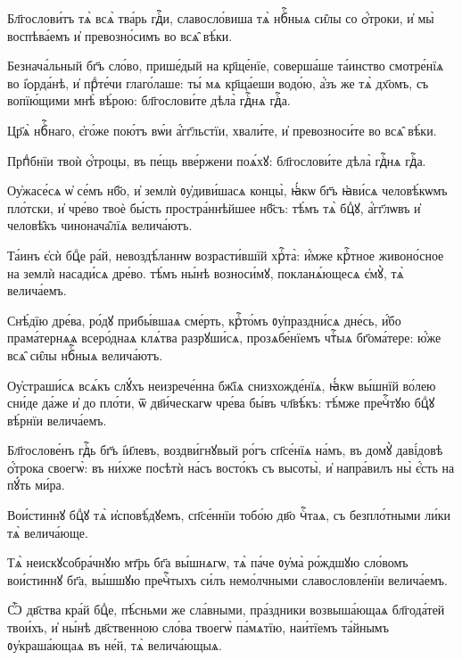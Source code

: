 \hKv Бл҃гослови́тъ тѧ̀ всѧ̀ тва́рь гдⷭ҇и, славосло́виша тѧ̀  нбⷭ҇ныѧ си̑лы со ѻ҆́троки, и҆ мы̀ воспѣва́емъ и҆  превозно́симъ во всѧ̑ вѣ́ки. 

\hKv Безнача́льный бг҃ъ сло́во, прише́дый на кр҃ще́нїе,  соверша́ше та́инство смотре́нїѧ во і҆ѻрда́нѣ, и҆ прⷣте́чи  глаго́лаше: ты́ мѧ кр҃ща́еши водо́ю, а҆́зъ же тѧ̀ дх҃омъ, съ  вопїю́щими мнѣ̀ вѣ́рою: бл҃гослови́те дѣла̀ гдⷭ҇нѧ гдⷭ҇а.  

\hKv Цр҃ѧ̀ нбⷭ҇наго, є҆го́же пою́тъ вѡ́и а҆́гг҃льстїи, хвали́те,  и҆ превозноси́те во всѧ̑ вѣ́ки.  

\hKv Прпⷣбнїи твоѝ ѻ҆́троцы, въ пе́щь вве́ржени поѧ́хꙋ:  бл҃гослови́те дѣла̀ гдⷭ҇нѧ гдⷭ҇а. 
%

\hKv Оу҆жасе́сѧ ѡ҆ се́мъ нб҃о, и҆ землѝ ᲂу҆диви́шасѧ концы̀,  ꙗ҆́кѡ бг҃ъ ꙗ҆ви́сѧ человѣ́кѡмъ пло́тски, и҆ чре́во твоѐ  бы́сть  простра́ннѣйшее нб҃съ:  тѣ́мъ тѧ̀ бцⷣꙋ, а҆́гг҃лѡвъ и҆ человѣ̑къ чинонача̑лїѧ  велича́ютъ. 
%

\hKv Та́инъ є҆сѝ бцⷣе ра́й,  невоздѣ́ланнѡ возрасти́вшїй хрⷭ҇та̀: и҆́мже крⷭ҇тное  живоно́сное на землѝ насади́сѧ дре́во. тѣ́мъ ны́нѣ  возноси́мꙋ, покланѧ́ющесѧ є҆мꙋ̀, тѧ̀ велича́емъ. 

\hKv Снѣ́дїю дре́ва, ро́дꙋ прибы́вшаѧ сме́рть, крⷭ҇то́мъ  ᲂу҆праздни́сѧ дне́сь, и҆́бо прама́тернѧѧ всеро́днаѧ клѧ́тва  разрꙋши́сѧ, прозѧбе́нїемъ чтⷭ҇ыѧ бг҃ома́тере: ю҆́же всѧ̑  си̑лы нбⷭ҇ныѧ велича́ютъ. 
%

\hKv Оу҆страши́сѧ всѧ́къ слꙋ́хъ неизрече́нна бж҃їѧ  снизхожде́нїѧ, ꙗ҆́кѡ вы́шнїй во́лею сни́де да́же и҆ до  пло́ти, ѿ дв҃и́ческагѡ чре́ва бы́въ чл҃вѣ́къ: тѣ́мже  пречⷭ҇тꙋю бцⷣꙋ вѣ́рнїи велича́емъ. 

\hKv Бл҃гослове́нъ гдⷭ҇ь бг҃ъ і҆и҃левъ, воздви́гнꙋвый ро́гъ  сп҃се́нїѧ на́мъ, въ домꙋ̀ даві́довѣ ѻ҆́трока  своегѡ̀: въ ни́хже посѣтѝ на́съ  восто́къ съ высоты̀, и҆ напра́вилъ ны̀ є҆́сть на пꙋ́ть  ми́ра. 

\hKv Вои́стиннꙋ бцⷣꙋ тѧ̀ и҆сповѣ́дꙋемъ, сп҃се́ннїи тобо́ю дв҃о  чⷭ҇таѧ, съ безпло́тными ли́ки тѧ̀ велича́юще. 

\hKv Тѧ̀ неискꙋсобра́чнꙋю мт҃рь бг҃а вы́шнѧгѡ, тѧ̀ па́че ᲂу҆ма̀  ро́ждшꙋю сло́вомъ вои́стиннꙋ бг҃а, вы́шшꙋю пречⷭ҇тыхъ си́лъ  немо́лчными славословле́нїи велича́емъ. 

\hKv Ѽ дв҃ства кра́й бцⷣе, пѣ́сньми же сла́вными, пра́здники  возвыша́ющаѧ бл҃года́тей твои́хъ, и҆ ны́нѣ дв҃ственною  сло́ва твоегѡ̀ па́мѧтїю, наи́тїемъ та́йнымъ ᲂу҆краша́ющаѧ  въ не́й, тѧ̀ велича́ющыѧ. 

